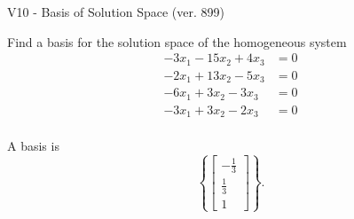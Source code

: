 \begin{exercise}
  \begin{exerciseTitle}V10 - Basis of Solution Space (ver. 899)\end{exerciseTitle}
  \begin{exerciseStatement}
    Find a basis for the solution space of the homogeneous system 
\begin{align*}
 -3 x_ 1 -15 x_ 2 + 4 x_ 3 &= 0  \\ 
  -2 x_ 1 + 13 x_ 2 -5 x_ 3 &= 0  \\ 
  -6 x_ 1 + 3 x_ 2 -3 x_ 3 &= 0  \\ 
  -3 x_ 1 + 3 x_ 2 -2 x_ 3 &= 0  \\ 
 \end{align*}


 
  \end{exerciseStatement}

  \begin{exerciseAnswer}
   A basis is   
\[\left\{\left[\begin{array}{c}
-\frac{1}{3} \\
\frac{1}{3} \\
1
\end{array}\right]\right\}.\]

  


  \end{exerciseAnswer}
\end{exercise}